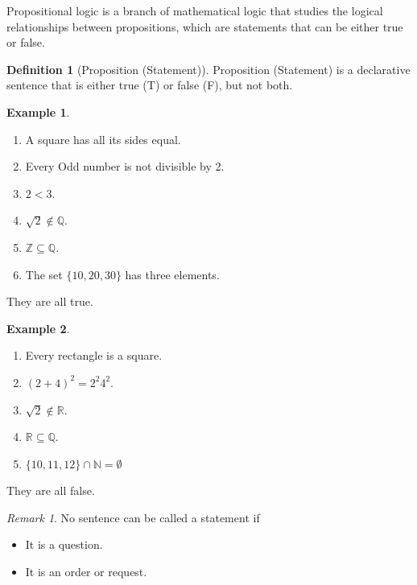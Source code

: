 \documentclass[
]{book}
\providecommand{\tightlist}{%
  \setlength{\itemsep}{0pt}\setlength{\parskip}{0pt}}
\theoremstyle{definition}
\newtheorem{definition}{Definition}[chapter]
\theoremstyle{definition}
\newtheorem{example}{Example}[chapter]
\theoremstyle{definition}
\theoremstyle{definition}
\theoremstyle{remark}
\newtheorem*{remark}{Remark}
\begin{document}
Propositional logic is a branch of mathematical logic that studies the logical relationships between propositions, which are statements that can be either true or false.

\begin{definition}[Proposition (Statement)]
\protect\hypertarget{def:unnamed-chunk-1}{}\label{def:unnamed-chunk-1}Proposition (Statement) is a declarative sentence that is either true (T) or false (F), but not both.
\end{definition}

\begin{example}
\protect\hypertarget{exm:unnamed-chunk-2}{}\label{exm:unnamed-chunk-2}\leavevmode

\begin{enumerate}
\def\labelenumi{(\roman{enumi})}
\tightlist
\item
  A square has all its sides equal.
\item
  Every Odd number is not divisible by 2.
\item
  \(2 < 3\).
\item
  \(\sqrt{2}\not\in \mathbb{Q}\).
\item
  \(\mathbb{Z}\subseteq \mathbb{Q}\).
\item
  The set \(\{10, 20, 30\}\) has three elements.
\end{enumerate}

They are all true.

\end{example}

\begin{example}
\protect\hypertarget{exm:unnamed-chunk-3}{}\label{exm:unnamed-chunk-3}\leavevmode

\begin{enumerate}
\def\labelenumi{(\roman{enumi})}
\tightlist
\item
  Every rectangle is a square.
\item
  \((2 +4)^2 = 2^2 4^2\).
\item
  \(\sqrt{2}\not\in\mathbb{R}\).
\item
  \(\mathbb{R} \subseteq \mathbb{Q}\).
\item
  \(\{10, 11, 12\} \cap \mathbb{N}=\emptyset\)
\end{enumerate}

They are all false.

\end{example}

\begin{remark}

No sentence can be called a statement if

\begin{itemize}
\tightlist
\item
  It is a question.
\item
  It is an order or request.
\end{itemize}

\end{remark}
\end{document}
